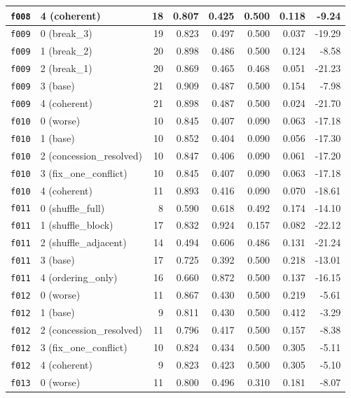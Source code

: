 \documentclass[11pt]{article}
\begin{document}
\begin{table}[htbp]
\begin{tabular}{llrrrrrr}
\texttt{f008} & 4 (coherent) & 18 & 0.807 & 0.425 & 0.500 & 0.118 & -9.24 \\
\midrule
\texttt{f009} & 0 (break\_3) & 19 & 0.823 & 0.497 & 0.500 & 0.037 & -19.29 \\
\texttt{f009} & 1 (break\_2) & 20 & 0.898 & 0.486 & 0.500 & 0.124 & -8.58 \\
\texttt{f009} & 2 (break\_1) & 20 & 0.869 & 0.465 & 0.468 & 0.051 & -21.23 \\
\texttt{f009} & 3 (base) & 21 & 0.909 & 0.487 & 0.500 & 0.154 & -7.98 \\
\texttt{f009} & 4 (coherent) & 21 & 0.898 & 0.487 & 0.500 & 0.024 & -21.70 \\
\midrule
\texttt{f010} & 0 (worse) & 10 & 0.845 & 0.407 & 0.090 & 0.063 & -17.18 \\
\texttt{f010} & 1 (base) & 10 & 0.852 & 0.404 & 0.090 & 0.056 & -17.30 \\
\texttt{f010} & 2 (concession\_resolved) & 10 & 0.847 & 0.406 & 0.090 & 0.061 & -17.20 \\
\texttt{f010} & 3 (fix\_one\_conflict) & 10 & 0.845 & 0.407 & 0.090 & 0.063 & -17.18 \\
\texttt{f010} & 4 (coherent) & 11 & 0.893 & 0.416 & 0.090 & 0.070 & -18.61 \\
\midrule
\texttt{f011} & 0 (shuffle\_full) & 8 & 0.590 & 0.618 & 0.492 & 0.174 & -14.10 \\
\texttt{f011} & 1 (shuffle\_block) & 17 & 0.832 & 0.924 & 0.157 & 0.082 & -22.12 \\
\texttt{f011} & 2 (shuffle\_adjacent) & 14 & 0.494 & 0.606 & 0.486 & 0.131 & -21.24 \\
\texttt{f011} & 3 (base) & 17 & 0.725 & 0.392 & 0.500 & 0.218 & -13.01 \\
\texttt{f011} & 4 (ordering\_only) & 16 & 0.660 & 0.872 & 0.500 & 0.137 & -16.15 \\
\midrule
\texttt{f012} & 0 (worse) & 11 & 0.867 & 0.430 & 0.500 & 0.219 & -5.61 \\
\texttt{f012} & 1 (base) & 9 & 0.811 & 0.430 & 0.500 & 0.412 & -3.29 \\
\texttt{f012} & 2 (concession\_resolved) & 11 & 0.796 & 0.417 & 0.500 & 0.157 & -8.38 \\
\texttt{f012} & 3 (fix\_one\_conflict) & 10 & 0.824 & 0.434 & 0.500 & 0.305 & -5.11 \\
\texttt{f012} & 4 (coherent) & 9 & 0.823 & 0.423 & 0.500 & 0.305 & -5.10 \\
\midrule
\texttt{f013} & 0 (worse) & 11 & 0.800 & 0.496 & 0.310 & 0.181 & -8.07 \\

\end{tabular}
\end{table}
\end{document}
